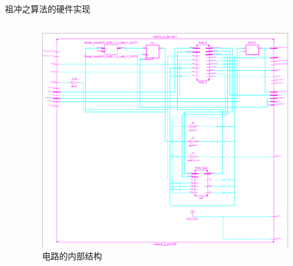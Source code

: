 \documentclass{beamer}
\begin{document}
\begin{frame}{祖冲之算法的硬件实现}
\begin{columns}
\begin{column}{0.4\textwidth}
    \end{column}
    \begin{column}{0.6\textwidth}
        \begin{figure}[htbp]
            \includegraphics[width=\columnwidth]{./images/circuit_more.png}
            \caption*{电路的内部结构}
        \end{figure}
    \end{column}
\end{columns}
\end{frame}
\end{document}

